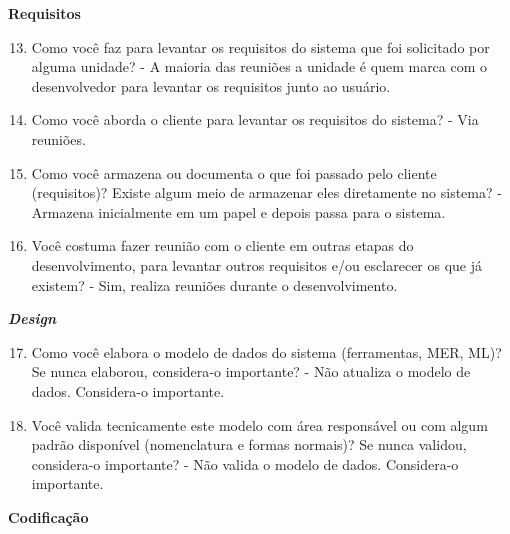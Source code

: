 \begin{apendicesenv}
\textbf{Requisitos}

\begin{enumerate}
	\setcounter{enumi}{12}
	\item Como você faz para levantar os requisitos do sistema que foi solicitado por alguma
	unidade?\newline
	- A maioria das reuniões a unidade é quem marca com o desenvolvedor para levantar os requisitos junto ao usuário.
	\item Como você aborda o cliente para levantar os requisitos do sistema?\newline
	- Via reuniões.
	\item Como você armazena ou documenta o que foi passado pelo cliente (requisitos)? Existe
	algum meio de armazenar eles diretamente no sistema?\newline
	- Armazena inicialmente em um papel e depois passa para o sistema.
	\item Você costuma fazer reunião com o cliente em outras etapas do desenvolvimento, para
	levantar outros requisitos e/ou esclarecer os que já existem?\newline
	- Sim, realiza reuniões durante o desenvolvimento.
\end{enumerate}

\textbf{\textit{Design}}

\begin{enumerate}
	\setcounter{enumi}{16}
	\item Como você elabora o modelo de dados do sistema (ferramentas, MER, ML)? Se nunca
	elaborou, considera-o importante?\newline
	- Não atualiza o modelo de dados. Considera-o importante.
	\item Você valida tecnicamente este modelo com área responsável ou com algum padrão
	disponível (nomenclatura e formas normais)? Se nunca validou, considera-o importante?\newline
	- Não valida o modelo de dados. Considera-o importante.
\end{enumerate}

\textbf{Codificação}


\end{apendicesenv}
